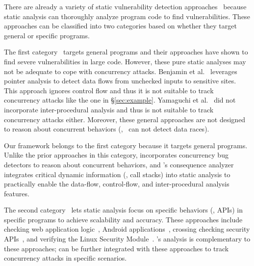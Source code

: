  There are already a 
variety of static vulnerability detection 
approaches~\cite{livshits05finding,yamaguchi:sp14,felmetsger:usec10,
flowdroid:pldi14,srivastava:pldi11,zhang:usenix:sec02} because 
static analysis can thoroughly analyze program code to find vulnerabilities. 
These approaches can be classified into two categories based on whether they 
target general or specific programs.

The first category~\cite{livshits05finding,yamaguchi:sp14} targets general 
programs and their approaches have shown to find severe vulnerabilities in large 
code. However, these pure static analyses may not be adequate to cope with 
concurrency attacks. Benjamin et al.~\cite{livshits05finding} leverages pointer 
analysis to detect data flows from unchecked inputs to sensitive sites. 
This approach ignores control flow and thus it is not suitable to track 
concurrency attacks like the \libsafe one in \S\ref{sec:example}. Yamaguchi 
et al.~\cite{yamaguchi:sp14} did not incorporate inter-procedural analysis and thus 
is not suitable to track concurrency attacks either. Moreover, these general 
approaches are not designed to reason about concurrent behaviors 
(\eg,~\cite{yamaguchi:sp14} can not detect data races).

Our \xxx framework belongs to the first category because it targets general 
programs. Unlike the prior approaches in this category, \xxx incorporates 
concurrency bug detectors to reason about concurrent behaviors, and \xxx's 
consequence analyzer integrates critical dynamic information (\ie, call stacks) 
into static analysis to practically enable the data-flow, control-flow, 
and inter-procedural analysis features.

The second category~\cite{felmetsger:usec10,
flowdroid:pldi14,srivastava:pldi11,zhang:usenix:sec02} lets static analysis 
focus on specific behaviors (\eg, APIs) in specific programs to achieve 
scalability and accuracy. These approaches include checking web application 
logic~\cite{felmetsger:usec10}, Android applications~\cite{flowdroid:pldi14}, 
crossing checking security APIs~\cite{srivastava:pldi11}, and verifying the 
Linux Security Module~\cite{zhang:usenix:sec02}. \xxx's analysis is 
complementary to these approaches; \xxx can be further integrated with these 
approaches to track concurrency attacks in specific scenarios.

% 

